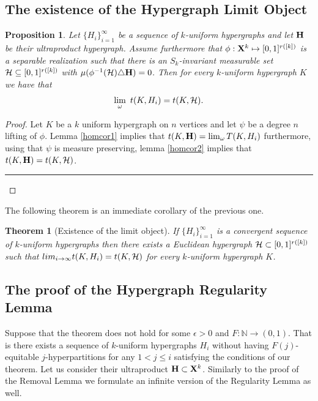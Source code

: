 \documentclass [11pt] {article}
\newcommand{\qed} {\hspace {0.1in} \rule {1.5mm} {3.5mm}}
\newtheorem{theorem}{Theorem}
\newtheorem{proposition}{Proposition}[section]
\def\e{\epsilon}
\def\limo{\lim_{\omega}}
\def\bH{{\bf H}}
\def\bN{{\mathbb N}}\def\bQ{{\mathbb Q}}
\def\cH{\mbox{$\cal H$}}
\def\to{\rightarrow}
\def\xo{{\bf X}}
\begin{document}
\subsection{The existence of the Hypergraph Limit Object}\label{hypgr}





\begin{proposition}\label{lemma31} Let $\{H_i\}_{i=1}^{\infty}$ be a
sequence of
  $k$-uniform hypergraphs and let $\bH$ be their ultraproduct hypergraph.
 Assume furthermore that $\phi:\xo^k\mapsto [0,1]^{r([k])}$ is a separable
 realization such that there is an $S_k$-invariant measurable
set $\cH\subseteq [0,1]^{r([k])}$ with
$\mu(\phi^{-1}(\cH)\triangle\bH)=0$. Then for every $k$-uniform
hypergraph $K$ we have that
$$\limo~ t(K,H_i)=t(K,\cH).$$
\end{proposition}

\begin{proof} Let $K$ be a $k$ uniform hypergraph on $n$ vertices and let
  $\psi$ be a degree $n$ lifting of $\phi$.
Lemma \ref{homcor1} implies that $t(K,\bH)=\lim_{\omega} T(K,H_i)$
furthermore, using that $\psi$ is measure preserving,
lemma \ref{homcor2} implies that $t(K,\bH)=t(K,\cH)$.
\qed\end{proof}

The following theorem is an immediate corollary of the previous one.

\begin{theorem} [Existence of the limit object] \label{lobtetel}
If $\{H_i\}_{i=1}^{\infty}$ is a convergent sequence of
  $k$-uniform hypergraphs then there exists a Euclidean
  hypergraph $\cH\subset [0,1]^{r([k])}$
 such that $lim_{i\to\infty}t(K,H_i)=t(K,\cH)$ for every
  $k$-uniform hypergraph $K$.
\end{theorem}

\medskip





\subsection{The proof of the Hypergraph Regularity Lemma}



Suppose that the theorem does not hold for some $\e>0$ and
$F:\bN\to (0,1)$. That is there exists a sequence of $k$-uniform
hypergraphs $H_i$ without having $F(j)$-equitable
$j$-hyperpartitions for any $1<j\leq i$ satisfying the conditions of
our theorem. Let us consider their ultraproduct
$\bH\subset \xo^k$. Similarly to the
proof of the Removal Lemma we formulate an infinite version of the
Regularity Lemma as well.
\end{document}
